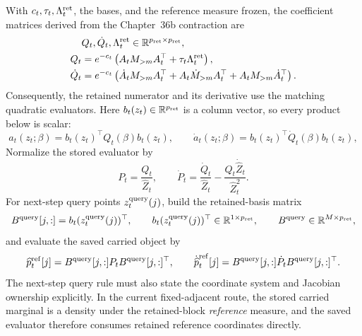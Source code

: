 With \(c_t,\tau_t,\Lambda_t^{\rm ret}\), the bases, and the reference measure
frozen, the coefficient matrices derived from the Chapter~36b contraction are
\begin{equation}
\begin{aligned}
  &Q_t,\dot Q_t,\Lambda_t^{\rm ret}
  \in\mathbb{R}^{p_{\rm ret}\times p_{\rm ret}},\\
  Q_t
  &=
  e^{-c_t}\left(
  A_tM_{>m}A_t^\top+\tau_t\Lambda_t^{\rm ret}\right),\\
  \dot Q_t
  &=
  e^{-c_t}\left(
  \dot A_tM_{>m}A_t^\top+
  A_t\dot M_{>m}A_t^\top+
  A_tM_{>m}\dot A_t^\top\right).
\end{aligned}
  \label{eq:bf-hd-ttkr-retained-Q-construction}
\end{equation}
Consequently, the retained numerator and its derivative use the matching
quadratic evaluators.  Here \(b_t(z_t)\in\mathbb{R}^{p_{\rm ret}}\) is a column vector,
so every product below is scalar:
\begin{equation}
  a_t(z_t;\beta)=b_t(z_t)^\top Q_t(\beta)b_t(z_t),
  \qquad
  \dot a_t(z_t;\beta)=b_t(z_t)^\top\dot Q_t(\beta)b_t(z_t),
  \label{eq:bf-hd-ttkr-retained-Q}
\end{equation}
Normalize the stored evaluator by
\begin{equation}
  P_t=\frac{Q_t}{\widehat Z_t},
  \qquad
  \dot P_t=
  \frac{\dot Q_t}{\widehat Z_t}
  -
  \frac{Q_t\dot{\widehat Z}_t}{\widehat Z_t^2}.
  \label{eq:bf-hd-ttkr-retained-P}
\end{equation}
For next-step query points $z_t^{\rm query}(j)$, build the retained-basis matrix
\begin{equation}
  B^{\rm query}[j,:]=b_t(z_t^{\rm query}(j))^\top,
  \qquad
  b_t(z_t^{\rm query}(j))^\top\in\mathbb{R}^{1\times p_{\rm ret}},
  \qquad B^{\rm query}\in\mathbb{R}^{M\times p_{\rm ret}},
  \label{eq:bf-hd-ttkr-retained-query-basis}
\end{equation}
and evaluate the saved carried object by
\begin{equation}
  \widehat p_t^{\rm ref}[j]
  =
  B^{\rm query}[j,:]P_tB^{\rm query}[j,:]^\top,
  \qquad
  \dot{\widehat p}_t^{\rm ref}[j]
  =
  B^{\rm query}[j,:]\dot P_tB^{\rm query}[j,:]^\top.
  \label{eq:bf-hd-ttkr-retained-query-rule}
\end{equation}
The next-step query rule must also state the coordinate system and Jacobian
ownership explicitly.  In the current fixed-adjacent route, the stored carried
marginal is a density under the retained-block \emph{reference} measure, and the
saved evaluator therefore consumes retained reference coordinates directly.
